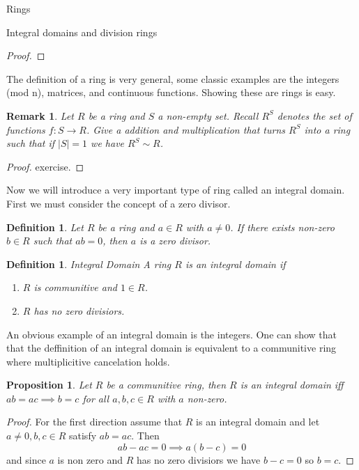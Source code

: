 \documentclass[11pt]{report}
\theoremstyle{break}
\newtheorem{defn}[thm]{Definition}
\newtheorem{prop}[thm]{Proposition}
\newtheorem{rem}[thm]{Remark}
\begin{document}
\begin{chapter}{Rings}
\begin{section}{Integral domains and division rings}
\begin{proof}
    \end{proof}

The definition of a ring is very general, some classic examples are the integers (mod n), matrices, and continuous functions. Showing these are rings is easy. 
    
    \begin{rem}
        Let $R$ be a ring and $S$ a non-empty set. Recall $R^S$ denotes the set of functions $f: S \to R$. Give a addition and multiplication that turns 
        $R^S$ into a ring such that if $|S| = 1$ we have $R^S \sim R$. 
    \end{rem}

    
    \begin{proof}
        exercise.
    \end{proof}


Now we will introduce a very important type of ring called an integral domain. First we must consider the concept of a zero divisor. 

\begin{defn}
    Let $R$ be a ring and $a \in R$ with $a \neq 0$. If there exists non-zero $b \in R$ such that $ab = 0$, then $a$ is a 
    zero divisor. 
\end{defn}


\begin{defn}{Integral Domain}
    A ring $R$ is an integral domain if  
    
    \begin{enumerate}
        \item $R$ is communitive and $1 \in R$.
        \item $R$ has no zero divisiors. 
    \end{enumerate}
    
\end{defn}

An obvious example of an integral domain is the integers. One can show that that the deffinition of an integral domain is equivalent to 
a communitive ring where multiplicitive cancelation holds. 


\begin{prop}
    Let $R$ be a communitive ring, then $R$ is an integral domain iff $ab = ac \implies b = c$ for all $a, b, c\in R$ with $a$ non-zero. 
\end{prop}


\begin{proof}
    For the first direction assume that $R$ is an integral domain and let $a \neq 0, b , c \in R$ satisfy $ab = ac$. Then 
    \[ab - ac = 0 \implies a(b - c) = 0\]
    and since $a$ is non zero and $R$ has no zero divisiors we have $b - c = 0$ so $b = c$. 


\end{proof}
\end{section}
\end{chapter}
\end{document}
